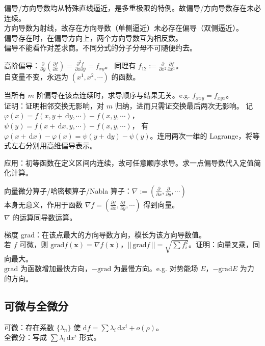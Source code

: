 \documentclass[12pt, a4paper, UTF8, openany]{ctexbook}
\newcommand{\dif}{\mathrm{d}}
\newcommand{\difx}{\,\mathrm{d}x}
\newcommand{\dify}{\,\mathrm{d}y}
\newcommand{\mat}[1]{\mathbf{#1}}
\newcommand{\len}[1]{||\, #1 \,||}%
\newcommand{\grad}{\mathrm{grad}}
\begin{document}
        偏导/方向导数均从特殊直线逼近，是多重极限的特例。故{\heiti 偏导/方向导数存在未必连续}。\\
        方向导数为射线，故存在方向导数（单侧逼近）未必存在偏导（双侧逼近）。\\
        偏导存在时，在偏导方向上，两个方向导数互为相反数。\\
        {\heiti 偏导不能看作对差求商}。不同分式的分子分母不可随便约去。

        高阶偏导：$\frac{\partial}{\partial y}(\frac{\partial f}{\partial x}) 
        = \frac{\partial^2 f}{\partial x \partial y} = f_{xy}$。
        同理有 $f_{12} := \frac{\partial}{\partial x^2} \frac{\partial f}{\partial x^1}$。\\
        {\heiti 自变量不变}，永远为 $(x^1, x^2, \cdots)$ 的函数。

        当所有 $m$ 阶偏导在该点连续时，{\heiti 求导顺序与结果无关}。e.g. $f_{xxy} = f_{xyx}$。\\
        证明：证明相邻交换无影响，对 $m$ 归纳，进而只需证交换最后两次无影响。
        记 $\varphi(x) = f(x, y + \dify, \cdots) - f(x, y, \cdots)$，$\psi(y) = f(x + \difx, y, \cdots) - f(x, y, \cdots)$，
        有 $\varphi(x + \difx) - \varphi(x) = \psi(y + \dify) - \psi(y)$。连用两次一维的 Lagrange，将等式左右分别用高维偏导表示。

        {\heiti 应用}：初等函数在定义区间内连续，故可{\heiti 任意顺序}求导。求一点偏导数代入定值简化计算。

        向量微分算子/哈密顿算子/Nabla 算子：$\nabla := (\frac{\partial}{\partial x}, \frac{\partial}{\partial y}, \cdots)$ \\
        本身无意义，作用于函数 $\nabla f = (\frac{\partial f}{\partial x}, \frac{\partial f}{\partial y}, \cdots)$ 得到向量。\\
        $\nabla$ 的运算同导数运算。

        梯度 $\grad$：在该点最大的方向导数方向，模长为该方向导数值。\\
        若 $f$ 可微，则 $\grad f(\mat{x}) = \nabla f(\mat{x})$，$\len{\grad f} = \sqrt{\sum f_i^2}$。证明：向量叉乘，同向最大。\\
        $\grad$ 为函数增加最快方向，$-\grad$ 为最慢方向。e.g. 对势能场 $E$，$-\grad E$ 为力的方向。

        \subsection{可微与全微分}
        可微：存在系数 $\{\lambda_n\}$ 使 $\dif f = \sum \lambda_i \difx^i + o(\rho)$。\\
        全微分：写成 $\sum \lambda_i \difx^i$ 形式。
\end{document}
